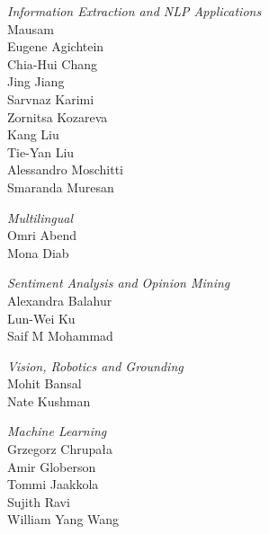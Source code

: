 \emph{Information Extraction and NLP Applications} \\
\hspace*{0.2in} Mausam \\
\hspace*{0.2in} Eugene Agichtein \\
\hspace*{0.2in} Chia-Hui Chang \\
\hspace*{0.2in} Jing Jiang \\
\hspace*{0.2in} Sarvnaz Karimi \\
\hspace*{0.2in} Zornitsa Kozareva \\
\hspace*{0.2in} Kang Liu \\
\hspace*{0.2in} Tie-Yan Liu \\
\hspace*{0.2in} Alessandro Moschitti \\
\hspace*{0.2in} Smaranda Muresan

\emph{Multilingual} \\
\hspace*{0.2in} Omri Abend \\
\hspace*{0.2in} Mona Diab

\emph{Sentiment Analysis and Opinion Mining} \\
\hspace*{0.2in} Alexandra Balahur \\
\hspace*{0.2in} Lun-Wei Ku \\
\hspace*{0.2in} Saif M Mohammad

\emph{Vision, Robotics and Grounding} \\
\hspace*{0.2in} Mohit Bansal \\
\hspace*{0.2in} Nate Kushman

\emph{Machine Learning} \\
\hspace*{0.2in} Grzegorz Chrupała \\
\hspace*{0.2in} Amir Globerson \\
\hspace*{0.2in} Tommi Jaakkola \\
\hspace*{0.2in} Sujith Ravi \\
\hspace*{0.2in} William Yang Wang

